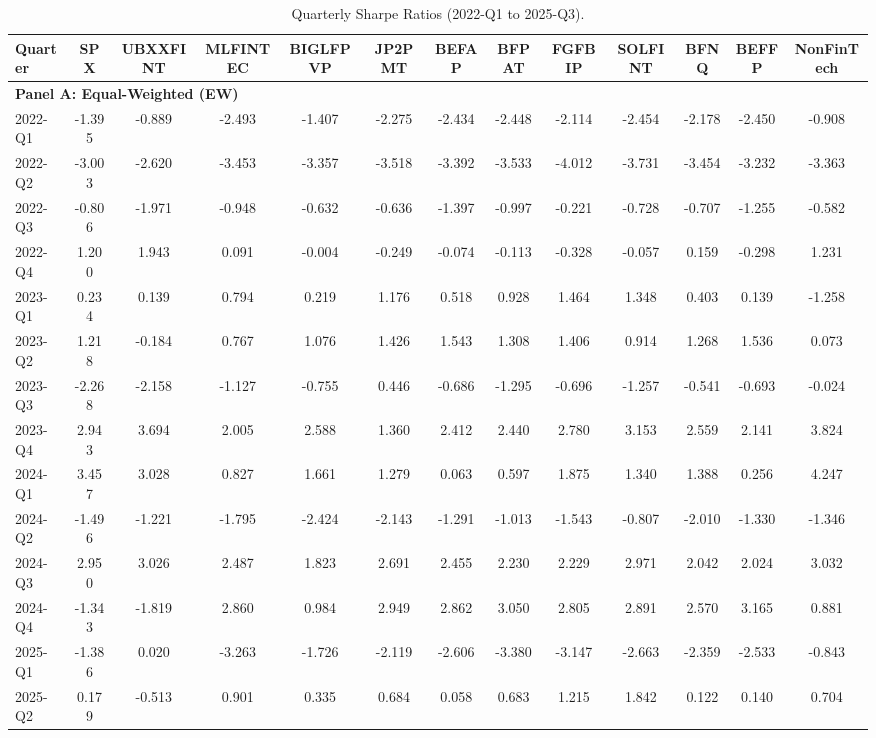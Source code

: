 \documentclass[12pt]{article}
\begin{document}
\begin{table}[htbp]
\centering
\caption{Quarterly Sharpe Ratios (2022-Q1 to 2025-Q3).}
\begin{adjustbox}{max width=\textwidth}
\begin{tabular}{lcccccccccccc}
\toprule
Quarter & SPX & UBXXFINT & MLFINTEC & BIGLFPVP & JP2PMT & BEFAP & BFPAT & FGFBIP & SOLFINT & BFNQ & BEFFP & NonFinTech \\
\midrule
\multicolumn{13}{l}{\textbf{Panel A: Equal-Weighted (EW)}} \\
\midrule
2022-Q1 & -1.395 & -0.889 & -2.493 & -1.407 & -2.275 & -2.434 & -2.448 & -2.114 & -2.454 & -2.178 & -2.450 & -0.908 \\
2022-Q2 & -3.003 & -2.620 & -3.453 & -3.357 & -3.518 & -3.392 & -3.533 & -4.012 & -3.731 & -3.454 & -3.232 & -3.363 \\
2022-Q3 & -0.806 & -1.971 & -0.948 & -0.632 & -0.636 & -1.397 & -0.997 & -0.221 & -0.728 & -0.707 & -1.255 & -0.582 \\
2022-Q4 & 1.200 & 1.943 & 0.091 & -0.004 & -0.249 & -0.074 & -0.113 & -0.328 & -0.057 & 0.159 & -0.298 & 1.231 \\
2023-Q1 & 0.234 & 0.139 & 0.794 & 0.219 & 1.176 & 0.518 & 0.928 & 1.464 & 1.348 & 0.403 & 0.139 & -1.258 \\
2023-Q2 & 1.218 & -0.184 & 0.767 & 1.076 & 1.426 & 1.543 & 1.308 & 1.406 & 0.914 & 1.268 & 1.536 & 0.073 \\
2023-Q3 & -2.268 & -2.158 & -1.127 & -0.755 & 0.446 & -0.686 & -1.295 & -0.696 & -1.257 & -0.541 & -0.693 & -0.024 \\
2023-Q4 & 2.943 & 3.694 & 2.005 & 2.588 & 1.360 & 2.412 & 2.440 & 2.780 & 3.153 & 2.559 & 2.141 & 3.824 \\
2024-Q1 & 3.457 & 3.028 & 0.827 & 1.661 & 1.279 & 0.063 & 0.597 & 1.875 & 1.340 & 1.388 & 0.256 & 4.247 \\
2024-Q2 & -1.496 & -1.221 & -1.795 & -2.424 & -2.143 & -1.291 & -1.013 & -1.543 & -0.807 & -2.010 & -1.330 & -1.346 \\
2024-Q3 & 2.950 & 3.026 & 2.487 & 1.823 & 2.691 & 2.455 & 2.230 & 2.229 & 2.971 & 2.042 & 2.024 & 3.032 \\
2024-Q4 & -1.343 & -1.819 & 2.860 & 0.984 & 2.949 & 2.862 & 3.050 & 2.805 & 2.891 & 2.570 & 3.165 & 0.881 \\
2025-Q1 & -1.386 & 0.020 & -3.263 & -1.726 & -2.119 & -2.606 & -3.380 & -3.147 & -2.663 & -2.359 & -2.533 & -0.843 \\
2025-Q2 & 0.179 & -0.513 & 0.901 & 0.335 & 0.684 & 0.058 & 0.683 & 1.215 & 1.842 & 0.122 & 0.140 & 0.704 \\

\end{tabular}
\end{adjustbox}
\end{table}
\end{document}
